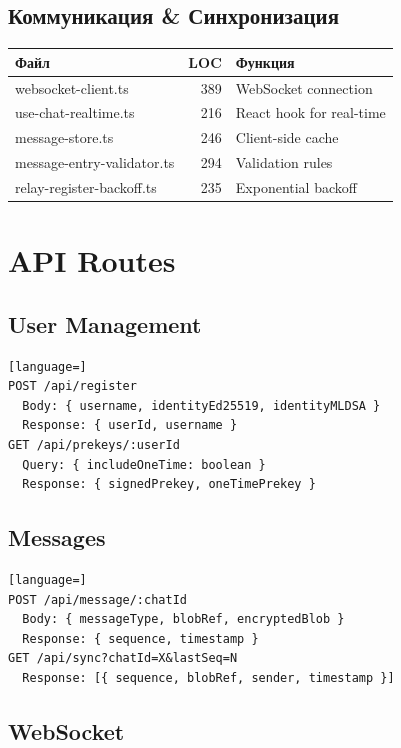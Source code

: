 \documentclass[11pt,a4paper,oneside]{book}
\begin{document}
\vspace{-0.2cm}\subsection{Коммуникация \& Синхронизация}
\begin{table}[h]
\centering
\begin{tabular}{|l|r|l|}
\hline
\textbf{Файл} & \textbf{LOC} & \textbf{Функция} \\
\hline
websocket-client.ts & 389 & WebSocket connection \\
\hline
use-chat-realtime.ts & 216 & React hook for real-time \\
\hline
message-store.ts & 246 & Client-side cache \\
\hline
message-entry-validator.ts & 294 & Validation rules \\
\hline
relay-register-backoff.ts & 235 & Exponential backoff \\
\hline
\end{tabular}
\end{table}
\vspace{-0.3cm}\section{API Routes}
\vspace{-0.2cm}\subsection{User Management}
\begin{lstlisting}[language=]
POST /api/register
  Body: { username, identityEd25519, identityMLDSA }
  Response: { userId, username }
GET /api/prekeys/:userId
  Query: { includeOneTime: boolean }
  Response: { signedPrekey, oneTimePrekey }
\end{lstlisting}
\vspace{-0.2cm}\subsection{Messages}
\begin{lstlisting}[language=]
POST /api/message/:chatId
  Body: { messageType, blobRef, encryptedBlob }
  Response: { sequence, timestamp }
GET /api/sync?chatId=X&lastSeq=N
  Response: [{ sequence, blobRef, sender, timestamp }]
\end{lstlisting}
\vspace{-0.2cm}\subsection{WebSocket}
\end{document}
